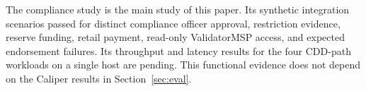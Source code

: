 \documentclass[conference]{IEEEtran}
\begin{document}
The compliance study is the main study of this paper. Its synthetic integration
scenarios passed for distinct compliance officer approval, restriction evidence, reserve funding,
retail payment, read-only ValidatorMSP access, and expected endorsement failures. Its
throughput and latency results for the four CDD-path workloads on a single host are
pending. This functional evidence does not depend on the Caliper results in
Section~\ref{sec:eval}.



\end{document}

